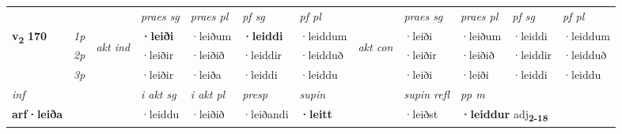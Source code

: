 \begin{longtable}[l]{X>{\footnotesize\itshape}llXXXXlXXXX}
 & &   & \textit{praes sg}  & \textit{praes pl}    & \textit{ pf sg} & \textit{pf pl} & & \textit{praes sg}  & \textit{praes pl}    & \textit{pf sg} & \textit{pf pl }  \\ \cmidrule{4-7} \cmidrule{9-12}
 \multirow{2}{*}{{{\textbf{v{\textsubscript{2}}} \Large{\textbf{170}}}}}  & 1p & \multirow{3}{*}{\begin{turn}{90}\textit{akt ind}\end{turn}} & \textbf{·leiði} & ·leiðum & \textbf{·leiddi} & ·leiddum & \multirow{3}{*}{\begin{turn}{90}\textit{akt con}\end{turn}} &·leiði & ·leiðum & ·leiddi & ·leiddum\\*
 & 2p &  &  ·leiðir  & ·leiðið & ·leiddir & ·leidduð & & ·leiðir & ·leiðið & ·leiddir & ·leidduð \\*
 & 3p &  & ·leiðir & ·leiða & ·leiddi & ·leiddu & & ·leiði & ·leiði& ·leiddi & ·leiddu \\*
\cmidrule{4-7} \cmidrule{9-12}

   {\textit{inf}} & &  & \textit{i akt sg} & \textit{i akt pl}   & \textit{presp} & \textit{supin} && \textit{supin refl} & \textit{pp m} \\*
  {\textbf{arf\allowbreak ·leiða}} & && ·leiddu  & ·leiðið   & ·leiðandi &  \textbf{·leitt} && ·leiðst & \multicolumn{2}{l}{\textbf{·leiddur} adj\textbf{\textsubscript{2-18}}} \\*

\midrule


\end{longtable}
